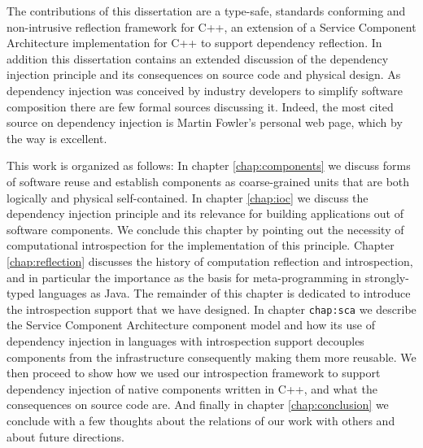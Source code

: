 The contributions of this dissertation are a type-safe, standards conforming and non-intrusive reflection framework for C++,
an extension of a Service Component Architecture implementation for C++ to support dependency reflection. In addition this
dissertation contains an extended discussion of the dependency injection principle and its consequences on source code and 
physical design. As dependency injection was conceived by industry developers to simplify software composition there are few
formal sources discussing it. Indeed, the most cited source on dependency injection is Martin Fowler's personal web page, which
by the way is excellent.

This work is organized as follows: In chapter \ref{chap:components} we discuss forms of software reuse and establish components
as coarse-grained units that are both logically and physical self-contained. In chapter \ref{chap:ioc} we discuss the dependency
injection principle and its relevance for building applications out of software components. We conclude this chapter by pointing
out the necessity of computational introspection for the implementation of this principle. Chapter \ref{chap:reflection} discusses
the history of computation reflection and introspection, and in particular the importance as the basis for meta-programming in
strongly-typed languages as Java. The remainder of this chapter is dedicated to introduce the introspection support that we
have designed. In chapter \texttt{chap:sca} we describe the Service Component Architecture component model and how its use
of dependency injection in languages with introspection support decouples components from the infrastructure consequently making
them more reusable. We then proceed to show how we used our introspection framework to support dependency injection of
native components written in C++, and what the consequences on source code are. And finally in chapter \ref{chap:conclusion} we
conclude with a few thoughts about the relations of our work with others and about future directions.